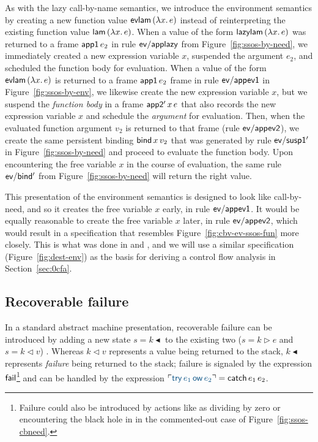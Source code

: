 As with the lazy call-by-name semantics, we introduce the environment
semantics by creating a new function value ${\sf evlam}\,(\lambda
x.\,e)$ instead of reinterpreting the existing function value ${\sf
  lam}\,(\lambda x.\,e)$. When a value of the form ${\sf
  lazylam}\,(\lambda x.\,e)$ was returned to a frame ${\sf app1}\,e_2$
in rule ${\sf ev/applazy}$ from Figure~\ref{fig:ssos-by-need}, we
immediately created a new expression variable $x$, suspended the
argument $e_2$, and scheduled the function body for evaluation. When a
value of the form ${\sf evlam}\,(\lambda x.\,e)$ is returned to a
frame ${\sf app1}\,e_2$ frame in rule ${\sf ev/appev1}$ in
Figure~\ref{fig:ssos-by-env}, we likewise create the new expression
variable $x$, but we suspend the {\it function body} in a frame ${\sf
  app2'}\,x\,e$ that also records the new expression variable $x$ and
schedule the {\it argument} for evaluation. Then, when the evaluated
function argument $v_2$ is returned to that frame (rule ${\sf
  ev/appev2}$), we create the same persistent binding ${\sf
  bind}\,x\,v_2$ that was generated by rule ${\sf ev/susp1'}$ in
Figure~\ref{fig:ssos-by-need} and proceed to evaluate the function
body. Upon encountering the free variable $x$ in the course of
evaluation, the same rule ${\sf ev/bind'}$ from
Figure~\ref{fig:ssos-by-need} will return the right value.

This presentation of the environment semantics is designed to look
like call-by-need, and so it creates the free variable $x$ early, in
rule ${\sf ev/appev1}$.  It would be equally reasonable to create the
free variable $x$ later, in rule ${\sf ev/appev2}$, which would result
in a specification that resembles
Figure~\ref{fig:cbv-ev-ssos-fun} more closely. This is what
was done in \cite{pfenning09substructural} and
\cite{simmons11logical}, and we will use a similar specification 
(Figure~\ref{fig:dest-env}) as the 
basis for deriving a control flow analysis in Section~\ref{sec:0cfa}.



\subsection{Recoverable failure}
\label{sec:failure}

In a standard abstract machine presentation, recoverable failure can 
be introduced by adding a new state $s = k {\blacktriangleleft}$
to the existing two ($s = k \rhd e$ and $s = k \lhd v$)
\cite[Chapter 28]{harper12practical}. Whereas $k
\lhd v$ represents a value being returned to the stack, $k
{\blacktriangleleft}$ represents {\it failure} being returned to the
stack; failure is signaled by the expression ${\sf fail}$\footnote{Failure 
could also be introduced by actions like as dividing
by zero or encountering the black hole in in the commented-out case of
Figure~\ref{fig:ssos-cbneed}.} and
can be handled by the expression $\interp{{\sf try}\,e_1\,{\sf ow}\,e_2} = 
{\sf catch}\,e_1\,e_2$. 

